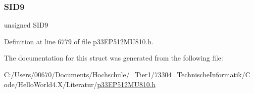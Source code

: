 \subsubsection{\texorpdfstring{S\+I\+D9}{SID9}}
{\footnotesize\ttfamily unsigned S\+I\+D9}



Definition at line 6779 of file p33\+E\+P512\+M\+U810.\+h.



The documentation for this struct was generated from the following file\+:\begin{DoxyCompactItemize}
\item 
C\+:/\+Users/00670/\+Documents/\+Hochschule/\+\_\+\+Tier1/73304\+\_\+\+Technische\+Informatik/\+Code/\+Hello\+World4.\+X/\+Literatur/\hyperlink{p33_e_p512_m_u810_8h}{p33\+E\+P512\+M\+U810.\+h}\end{DoxyCompactItemize}
